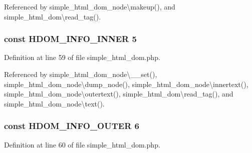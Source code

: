 Referenced by simple\+\_\+html\+\_\+dom\+\_\+node\textbackslash{}makeup(), and simple\+\_\+html\+\_\+dom\textbackslash{}read\+\_\+tag().

\hypertarget{simple__html__dom_8php_ab2b42db1e28668502af838f684ca5577}{}
\subsubsection[{H\+D\+O\+M\+\_\+\+I\+N\+F\+O\+\_\+\+I\+N\+N\+E\+R}]{\setlength{\rightskip}{0pt plus 5cm}const H\+D\+O\+M\+\_\+\+I\+N\+F\+O\+\_\+\+I\+N\+N\+E\+R 5}\label{simple__html__dom_8php_ab2b42db1e28668502af838f684ca5577}


Definition at line 59 of file simple\+\_\+html\+\_\+dom.\+php.



Referenced by simple\+\_\+html\+\_\+dom\+\_\+node\textbackslash{}\+\_\+\+\_\+set(), simple\+\_\+html\+\_\+dom\+\_\+node\textbackslash{}dump\+\_\+node(), simple\+\_\+html\+\_\+dom\+\_\+node\textbackslash{}innertext(), simple\+\_\+html\+\_\+dom\+\_\+node\textbackslash{}outertext(), simple\+\_\+html\+\_\+dom\textbackslash{}read\+\_\+tag(), and simple\+\_\+html\+\_\+dom\+\_\+node\textbackslash{}text().

\hypertarget{simple__html__dom_8php_a9261ef31b846c2545bd838f76d984938}{}
\subsubsection[{H\+D\+O\+M\+\_\+\+I\+N\+F\+O\+\_\+\+O\+U\+T\+E\+R}]{\setlength{\rightskip}{0pt plus 5cm}const H\+D\+O\+M\+\_\+\+I\+N\+F\+O\+\_\+\+O\+U\+T\+E\+R 6}\label{simple__html__dom_8php_a9261ef31b846c2545bd838f76d984938}


Definition at line 60 of file simple\+\_\+html\+\_\+dom.\+php.



